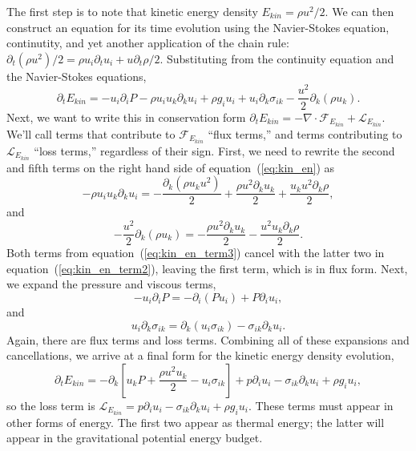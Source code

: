 \documentclass[letterpaper,12pt]{paper}
\begin{document}
The first step is to note that kinetic energy density
$E_{kin} = \rho u^2/2$. We can then construct an equation for its time
evolution using the Navier-Stokes equation, continutity, and yet
another application of the chain rule:
$\partial_t (\rho u^2)/2 = \rho u_i \partial_t u_i + u \partial_t
\rho/2$. Substituting from the continuity equation and the Navier-Stokes equations, 
\begin{equation}
  \label{eq:kin_en}
  \partial_t E_{kin} = -u_i \partial_i P - \rho u_i u_k \partial_k u_i + \rho g_i u_i + u_i \partial_k \sigma_{ik} - \frac{u^2}{2} \partial_k ( \rho u_k).
\end{equation}
Next, we want to write this in conservation form
$\partial_t E_{kin} = - \nabla \cdot \mathcal{F}_{E_{kin}} +
\mathcal{L}_{E_{kin}}$.
We'll call terms that contribute to $\mathcal{F}_{E_{kin}}$ ``flux
terms,'' and terms contributing to $\mathcal{L}_{E_{kin}}$ ``loss
terms,'' regardless of their sign. First, we need to rewrite the
second and fifth terms on the right hand side of
equation~(\ref{eq:kin_en}) as
\begin{equation}
  \label{eq:kin_en_term2}
  - \rho u_i u_k \partial_k u_i = -\frac{\partial_k (\rho u_k u^2)}{2} + \frac{\rho u^2 \partial_k u_k}{2} + \frac{u_k u^2 \partial_k \rho}{2}, 
\end{equation}
and
\begin{equation}
  \label{eq:kin_en_term3}
  -\frac{u^2}{2} \partial_k(\rho u_k) = -\frac{\rho u^2 \partial_k u_k }{2} -\frac{u^2 u_k \partial_k \rho}{2}.
\end{equation}
Both terms from equation~(\ref{eq:kin_en_term3}) cancel with the
latter two in equation~(\ref{eq:kin_en_term2}), leaving the first term, which is in flux form. Next, we expand the pressure and viscous terms,
\begin{equation}
  \label{eq:kin_en_pressure}
  -u_i \partial_i P  = - \partial_i (P u_i)+ P \partial_i u_i,
\end{equation}
and
\begin{equation}
  \label{eq:kin_en_viscous}
u_i \partial_k \sigma_{ik} = \partial_k (u_i \sigma_{ik}) - \sigma_{ik} \partial_k u_i.
\end{equation}
Again, there are flux terms and loss terms. Combining all of these expansions and cancellations, we arrive at a final form for the kinetic energy density evolution,
\begin{equation}
  \label{eq:final_kin_en}
  \partial_t E_{kin} = - \partial_k \left[ u_k P + \frac{\rho u^2 u_k}{2} - u_i \sigma_{ik} \right] + p \partial_i u_i - \sigma_{ik} \partial_k u_i + \rho g_i u_i,
\end{equation}
so the loss term is
$\mathcal{L}_{E_{kin}} = p \partial_i u_i - \sigma_{ik} \partial_k u_i
+ \rho g_i u_i$.
These terms must appear in other forms of energy. The first two appear
as thermal energy; the latter will appear in the gravitational potential energy budget.
\end{document}
